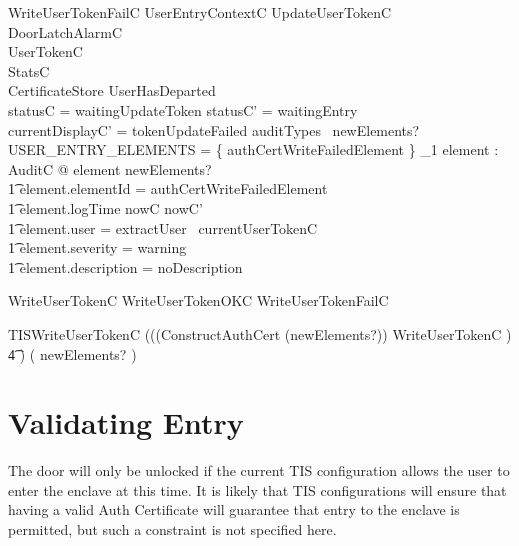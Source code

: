 \begin{schema}{WriteUserTokenFailC}
	UserEntryContextC
\also
        UpdateUserTokenC
\\	\Xi DoorLatchAlarmC
\\      \Xi UserTokenC
\\      \Xi StatsC
\\      \Xi CertificateStore
\where
        \lnot UserHasDeparted
\\	statusC = waitingUpdateToken
\also
        statusC' = waitingEntry
\\      currentDisplayC' = tokenUpdateFailed
\also
        auditTypes~ newElements? \cap USER\_ENTRY\_ELEMENTS = 
        \{ authCertWriteFailedElement \} 
\also
        \exists_1 element : AuditC @ element \in newElements? 
\\ \t1  \land element.elementId = authCertWriteFailedElement
\\ \t1  \land element.logTime \in nowC \upto nowC'
\\ \t1  \land element.user = extractUser~ currentUserTokenC
\\ \t1  \land element.severity = warning
\\ \t1  \land element.description = noDescription
\end{schema}

\begin{zed}
WriteUserTokenC  WriteUserTokenOKC \lor WriteUserTokenFailC
\end{zed}

\begin{zed}
        TISWriteUserTokenC  
        (((ConstructAuthCert \hide (newElements?)) \semi WriteUserTokenC )
\\ \t4          \lor [~ UserTokenTornC | statusC = waitingUpdateToken
        ~] )  \hide ( newElements? )
\end{zed}



\section{Validating Entry}

The door will only be unlocked if the current TIS configuration allows
the user to enter the enclave at this time. It is likely that TIS
configurations will ensure that having a valid Auth Certificate will
guarantee that entry to the enclave is permitted, but such a
constraint is not specified here. 


